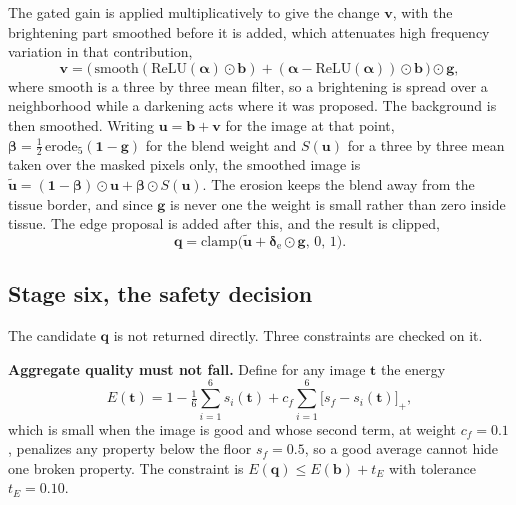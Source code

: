 The gated gain is applied multiplicatively to give the change $\mathbf{v}$, with the brightening part
smoothed before it is added, which attenuates high frequency variation in that contribution,
\begin{equation}
\mathbf{v} = \big(\,\mathrm{smooth}(\mathrm{ReLU}(\boldsymbol{\alpha}) \odot \mathbf{b})
 + (\boldsymbol{\alpha} - \mathrm{ReLU}(\boldsymbol{\alpha})) \odot \mathbf{b}\,\big) \odot \mathbf{g},
\label{eq:apply}
\end{equation}
where $\mathrm{smooth}$ is a three by three mean filter, so a brightening is spread over a
neighborhood while a darkening acts where it was proposed. The background is then smoothed. Writing
$\mathbf{u} = \mathbf{b} + \mathbf{v}$ for the image at that point,
$\boldsymbol{\beta} = \tfrac{1}{2}\,\mathrm{erode}_5(\mathbf{1} - \mathbf{g})$ for the blend weight
and $S(\mathbf{u})$ for a three by three mean taken over the masked pixels only, the smoothed image
is $\tilde{\mathbf{u}} = (\mathbf{1} - \boldsymbol{\beta}) \odot \mathbf{u} + \boldsymbol{\beta} \odot S(\mathbf{u})$.
The erosion keeps the blend away from the tissue border, and since $\mathbf{g}$ is never one the
weight is small rather than zero inside tissue. The edge proposal is added after this, and the result
is clipped,
\begin{equation}
\mathbf{q} = \mathrm{clamp}\big(\tilde{\mathbf{u}} + \boldsymbol{\delta}_{\mathrm{e}} \odot \mathbf{g},\, 0,\, 1\big).
\label{eq:candidate}
\end{equation}

\subsection{Stage six, the safety decision}
\label{sec:safety}
The candidate $\mathbf{q}$ is not returned directly. Three constraints are checked on it.

\textbf{Aggregate quality must not fall.} Define for any image $\mathbf{t}$ the energy
\begin{equation}
E(\mathbf{t}) = 1 - \tfrac{1}{6}\sum_{i=1}^{6} s_i(\mathbf{t})
 + c_f \sum_{i=1}^{6} \big[s_f - s_i(\mathbf{t})\big]_+ ,
\label{eq:energy}
\end{equation}
which is small when the image is good and whose second term, at weight $c_f = 0.1$, penalizes any
property below the floor $s_f = 0.5$, so a good average cannot hide one broken property. The
constraint is $E(\mathbf{q}) \le E(\mathbf{b}) + t_E$ with tolerance $t_E = 0.10$.

